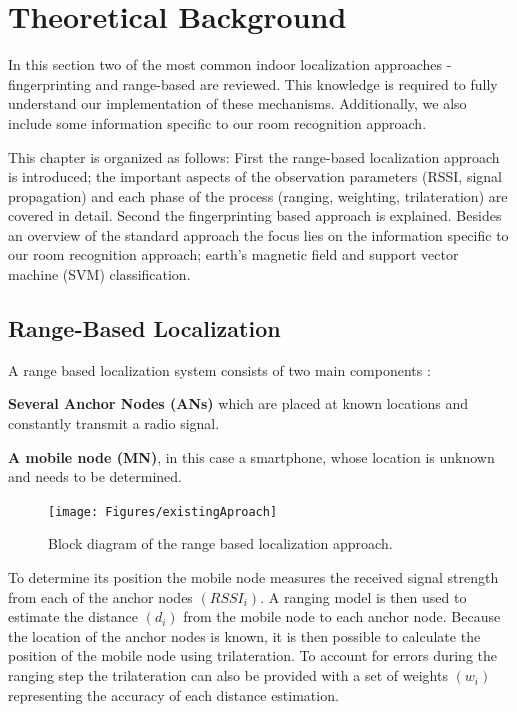 
\chapter{Theoretical Background} %

\label{Chapter2} %

In this section two of the most common indoor localization approaches - fingerprinting and range-based are reviewed. This knowledge is required to fully understand our implementation of these mechanisms. Additionally, we also include some information specific to our room recognition approach.

This chapter is organized as follows: First the range-based localization approach is introduced; the important aspects of the observation parameters (RSSI, signal propagation) and each phase of the process (ranging, weighting, trilateration) are covered in detail. Second the fingerprinting based approach is explained. Besides an overview of the standard approach the focus lies on the information specific to our room recognition approach; earth's magnetic field and support vector machine (SVM) classification.

\section{Range-Based Localization}
\label{therory:range-based}

A range based localization system consists of two main components \citep{surveyIndoorTechniques}:

\textbf{Several Anchor Nodes (ANs)} which are placed at known locations and constantly transmit a radio signal.

\textbf{A mobile node (MN)}, in this case a smartphone, whose location is unknown and needs to be determined.

\begin{figure}[ht]
\centering
\texttt{[image: Figures/existingAproach]}
\decoRule
\caption[Range-based localization approach]{Block diagram of the range based localization approach.}
\label{fig:existingApproach}
\end{figure}

To determine its position the mobile node measures the received signal strength from each of the anchor nodes $(RSSI_i)$. A ranging model is then used to estimate the distance $(d_i)$ from the mobile node to each anchor node. Because the location of the anchor nodes is known, it is then possible to calculate the position of the mobile node using trilateration. To account for errors during the ranging step the trilateration can also be provided with a set of weights $(w_i)$ representing the accuracy of each distance estimation.


